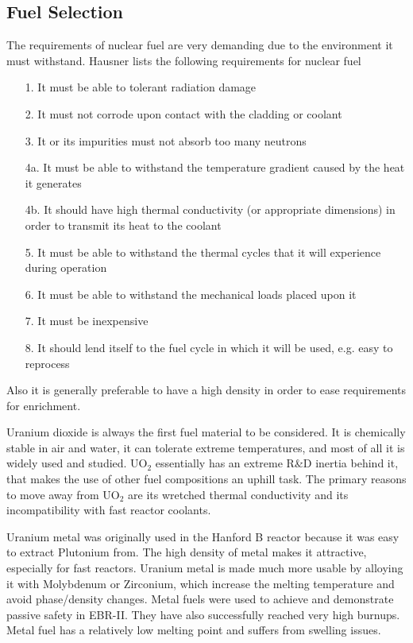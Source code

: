 \subsection{Fuel Selection}
The requirements of nuclear fuel are very demanding due to the environment it must withstand. Hausner \cite{Hausner}
lists the following requirements for nuclear fuel
\begin{itemize}
\item[1.] It must be able to tolerant radiation damage
\item[2.] It must not corrode upon contact with the cladding or coolant
\item[3.] It or its impurities must not absorb too many neutrons
\item[4a.] It must be able to withstand the temperature gradient caused by the heat it generates
\item[4b.] It should have high thermal conductivity (or appropriate dimensions) in order to transmit its heat to the coolant
\item[5.] It must be able to withstand the thermal cycles that it will experience during operation
\item[6.] It must be able to withstand the mechanical loads placed upon it
\item[7.] It must be inexpensive
\item[8.] It should lend itself to the fuel cycle in which it will be used, e.g. easy to reprocess
\end{itemize} 

Also it is generally preferable to have a high density in order to ease requirements for enrichment.

Uranium dioxide is always the first fuel material to be considered. 
It is chemically stable in air and water, it can tolerate extreme temperatures, and most of all it is widely used and studied. 
UO$_2$ essentially has an extreme R\&D inertia behind it, that makes the use of other fuel compositions an uphill task.
The primary reasons to move away from UO$_2$ are its wretched thermal conductivity and its incompatibility with fast reactor coolants.

Uranium metal was originally used in the Hanford B reactor because it was easy to extract Plutonium from. The high density of metal makes it attractive, especially for fast reactors.
Uranium metal is made much more usable by alloying it with Molybdenum or Zirconium, which increase the melting temperature and avoid phase/density changes.
Metal fuels were used to achieve and demonstrate passive safety in EBR-II. They have also successfully reached very high burnups.
Metal fuel has a relatively low melting point and suffers from swelling issues.

